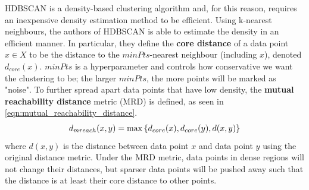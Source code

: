 HDBSCAN is a density-based clustering algorithm and, for this reason, requires an inexpensive density estimation method to be efficient. Using k-nearest neighbours, the authors of HDBSCAN is able to estimate the density in an efficient manner. In particular, they define the \textbf{core distance} of a data point $x \in X$ to be the distance to the $\textit{minPts}$-nearest neighbour (including $x$), denoted $d_{core}(x)$. $\textit{minPts}$ is a hyperparameter and controls how conservative we want the clustering to be; the larger $\textit{minPts}$, the more points will be marked as "noise". To further spread apart data points that have low density, the \textbf{mutual reachability distance} metric (MRD) is defined, as seen in \cref{eqn:mutual_reachability_distance}.
\begin{align}
    d_{mreach}(x, y) = \max \left\{ d_{core}(x), d_{core}(y), d(x, y) \right\}
    \label{eqn:mutual_reachability_distance}
\end{align}
where $d(x, y)$ is the distance between data point $x$ and data point $y$ using the original distance metric. Under the MRD metric, data points in dense regions will not change their distances, but sparser data points will be pushed away such that the distance is at least their core distance to other points.

